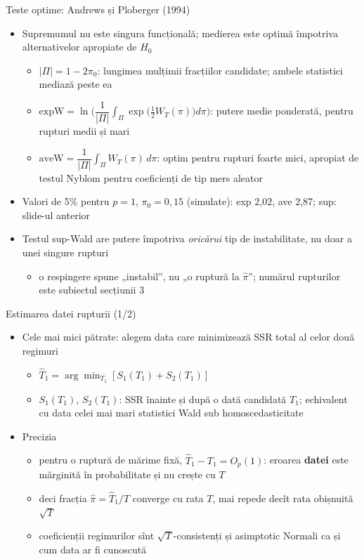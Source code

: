 \begin{frame}{Teste optime: Andrews și Ploberger (1994)}
\itemsize{\small}
\begin{itemize}
    \item Supremumul nu este singura funcțională; medierea este optimă împotriva alternativelor apropiate de $H_0$ 
    \begin{itemize}
        \item $|\Pi| = 1 - 2\pi_0$: lungimea mulțimii fracțiilor candidate; ambele statistici mediază peste ea
        \item $\mathrm{expW} = \ln\Big(\dfrac{1}{|\Pi|}\displaystyle\int_\Pi \exp\big(\tfrac12 W_T(\pi)\big)d\pi\Big)$: putere medie ponderată, pentru rupturi medii și mari
        \item $\mathrm{aveW} = \dfrac{1}{|\Pi|}\displaystyle\int_\Pi W_T(\pi)\,d\pi$: optim pentru rupturi foarte mici, apropiat de testul Nyblom pentru coeficienți de tip mers aleator
    \end{itemize}
    \item Valori de 5\% pentru $p = 1$, $\pi_0 = 0{,}15$ (simulate): exp 2{,}02, ave 2{,}87; sup: slide-ul anterior
    \item Testul sup-Wald are putere împotriva \emph{oricărui} tip de instabilitate, nu doar a unei singure rupturi
    \begin{itemize}
        \item o respingere spune „instabil”, nu „o ruptură la $\hat\pi$”; numărul rupturilor este subiectul secțiunii 3
    \end{itemize}
\end{itemize}
\end{frame}

\begin{frame}{Estimarea datei rupturii (1/2)}
\itemsize{\small}
\begin{itemize}
    \item Cele mai mici pătrate: alegem data care minimizează SSR total al celor două regimuri
    \begin{itemize}
        \item $\hat T_1 = \arg\min_{T_1} [S_1(T_1) + S_2(T_1)]$
        \item $S_1(T_1)$, $S_2(T_1)$: SSR înainte și după o dată candidată $T_1$; echivalent cu data celei mai mari statistici Wald sub homoscedasticitate
    \end{itemize}
    \item Precizia 
    \begin{itemize}
        \item pentru o ruptură de mărime fixă, $\hat T_1 - T_1 = O_p(1)$: eroarea \textbf{datei} este mărginită în probabilitate și nu crește cu $T$
        \item deci fracția $\hat\pi = \hat T_1/T$ converge cu rata $T$, mai repede decît rata obișnuită $\sqrt T$
        \item coeficienții regimurilor sînt $\sqrt T$-consistenți și asimptotic Normali ca și cum data ar fi cunoscută
    \end{itemize}
\end{itemize}
\end{frame}

